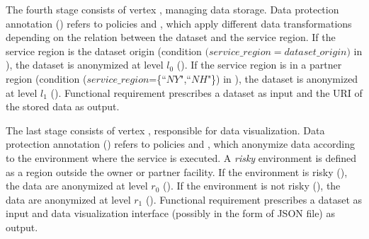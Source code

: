 \begin{example}[\bf \pipelineTemplate]
The fourth stage consists of vertex , managing data storage. Data protection annotation \myLambda() refers to policies  and , which apply different data transformations depending on the relation between the dataset and the service region.
If the service region is the dataset origin (condition $(service\_region$$=$$dataset\_origin)$ in ), the dataset is anonymized at level $l_0$ ().
If the service region is in a partner region (condition ($service\_region$=\{``$NY$",``$NH$"\}) in ), the dataset is anonymized at level $l_1$ ().
Functional requirement  prescribes a dataset as input and the URI of the stored data as output.

The last stage consists of vertex , responsible for data visualization.
Data protection annotation \myLambda() refers to policies  and , which anonymize data according to the environment where the service is executed.
A \emph{risky} environment is defined as a region outside the owner or partner facility.
If the environment is risky (), the data are anonymized at level $r_0$ ().
If the environment is not risky (), the data are anonymized at level $r_1$ ().
Functional requirement  prescribes a dataset as input and data visualization interface (possibly in the form of JSON file) as output.
\end{example}



